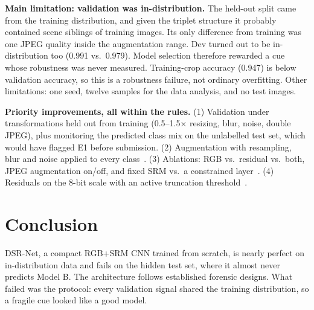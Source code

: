 \documentclass[10pt,twocolumn,letterpaper]{article}
\renewcommand{\paragraph}[1]{\vspace{0.2em}\noindent\textbf{#1.}}
\begin{document}
\paragraph{Main limitation: validation was in-distribution}
The held-out split came from the training distribution, and given the triplet structure it probably contained scene siblings of training images. Its only difference from training was one JPEG quality inside the augmentation range. Dev turned out to be in-distribution too (0.991 vs.\ 0.979). Model selection therefore rewarded a cue whose robustness was never measured. Training-crop accuracy (0.947) is below validation accuracy, so this is a robustness failure, not ordinary overfitting. Other limitations: one seed, twelve samples for the data analysis, and no test images.

\paragraph{Priority improvements, all within the rules}
(1) Validation under transformations held out from training (0.5--1.5$\times$ resizing, blur, noise, double JPEG), plus monitoring the predicted class mix on the unlabelled test set, which would have flagged E1 before submission. (2) Augmentation with resampling, blur and noise applied to every class~\cite{wang2020cnn}. (3) Ablations: RGB vs.\ residual vs.\ both, JPEG augmentation on/off, and fixed SRM vs.\ a constrained layer~\cite{bayar2016deep}. (4) Residuals on the 8-bit scale with an active truncation threshold~\cite{fridrich2012rich}.

\section{Conclusion}
DSR-Net, a compact RGB+SRM CNN trained from scratch, is nearly perfect on in-distribution data and fails on the hidden test set, where it almost never predicts Model B. The architecture follows established forensic designs. What failed was the protocol: every validation signal shared the training distribution, so a fragile cue looked like a good model.

{\small


}
\end{document}
